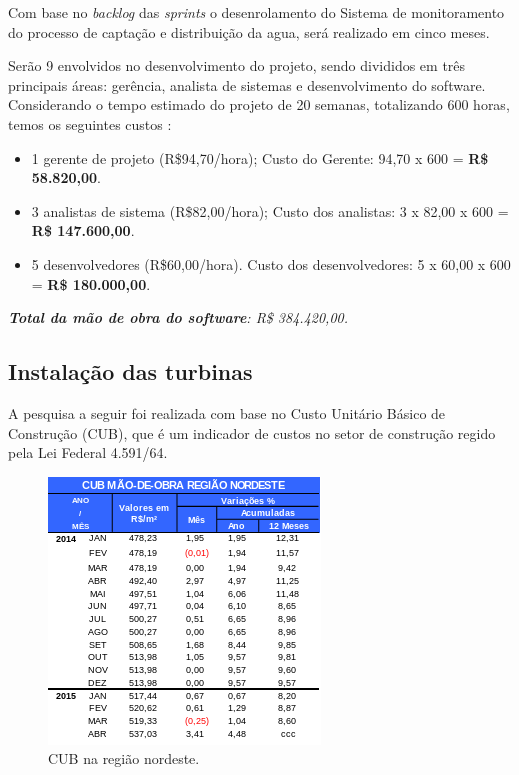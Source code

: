 	Com base no \textit{backlog} das \textit{sprints} o desenrolamento do Sistema de
	monitoramento do processo de captação e distribuição da agua, será realizado
	em cinco meses.
	
	Serão 9 envolvidos no desenvolvimento do projeto, sendo divididos em
	três principais áreas: gerência, analista de sistemas e desenvolvimento do
	software. Considerando o tempo estimado do projeto de 20 semanas, totalizando 
	600 horas, temos os seguintes custos \footnotemark:
	
	\begin{itemize}
	  \item 1 gerente de projeto (R\$94,70/hora);
	    \subitem Custo do Gerente: 94,70 x 600 = \textbf{R\$ 58.820,00}.
	  \item 3 analistas de sistema (R\$82,00/hora);
	    \subitem Custo dos analistas: 3 x 82,00 x 600 = \textbf{R\$ 147.600,00}.
	  \item 5 desenvolvedores (R\$60,00/hora).
	    \subitem Custo dos desenvolvedores: 5 x 60,00 x 600 = \textbf{R\$ 180.000,00}.
	\end{itemize}
	
	\emph{\textbf{Total da mão de obra do \textit{software}}: R\$ 384.420,00.}
	
      \subsection{Instalação das turbinas}
      
	A pesquisa a seguir foi realizada com base no Custo Unitário Básico de Construção (CUB), que é um indicador de custos no setor de construção regido pela Lei Federal 4.591/64.
	
	\FloatBarrier
	\begin{figure}[!h]
	    \centering
	    \includegraphics[scale = 1]{editaveis/figuras/cub_nordeste}
	    \caption[CUB na região nordeste]{CUB na região nordeste.}
	    \label{cub_nordeste}
	\end{figure}
	\FloatBarrier
	
